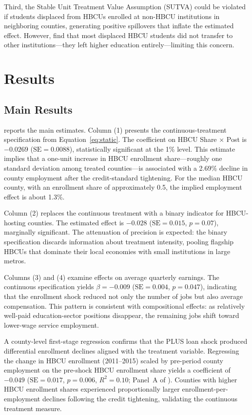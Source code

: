 \documentclass[12pt]{article}
\begin{document}
Third, the Stable Unit Treatment Value Assumption (SUTVA) could be violated if students displaced from HBCUs enrolled at non-HBCU institutions in neighboring counties, generating positive spillovers that inflate the estimated effect. However, \citet{johnson2015} find that most displaced HBCU students did not transfer to other institutions---they left higher education entirely---limiting this concern.

\section{Results}
\label{sec:results}

\subsection{Main Results}

 reports the main estimates. Column (1) presents the continuous-treatment specification from Equation~\eqref{eq:static}. The coefficient on HBCU Share $\times$ Post is $-0.0269$ ($\text{SE} = 0.0088$), statistically significant at the 1\% level. This estimate implies that a one-unit increase in HBCU enrollment share---roughly one standard deviation among treated counties---is associated with a 2.69\% decline in county employment after the credit-standard tightening. For the median HBCU county, with an enrollment share of approximately 0.5, the implied employment effect is about 1.3\%.

Column (2) replaces the continuous treatment with a binary indicator for HBCU-hosting counties. The estimated effect is $-0.028$ ($\text{SE} = 0.015$, $p = 0.07$), marginally significant. The attenuation of precision is expected: the binary specification discards information about treatment intensity, pooling flagship HBCUs that dominate their local economies with small institutions in large metros.

Columns (3) and (4) examine effects on average quarterly earnings. The continuous specification yields $\beta = -0.009$ ($\text{SE} = 0.004$, $p = 0.047$), indicating that the enrollment shock reduced not only the number of jobs but also average compensation. This pattern is consistent with compositional effects: as relatively well-paid education-sector positions disappear, the remaining jobs shift toward lower-wage service employment.

A county-level first-stage regression confirms that the PLUS loan shock produced differential enrollment declines aligned with the treatment variable. Regressing the change in HBCU enrollment (2011--2015) scaled by pre-period county employment on the pre-shock HBCU enrollment share yields a coefficient of $-0.049$ ($\text{SE} = 0.017$, $p = 0.006$, $R^2 = 0.10$; Panel~A of ). Counties with higher HBCU enrollment shares experienced proportionally larger enrollment-per-employment declines following the credit tightening, validating the continuous treatment measure.
\end{document}
